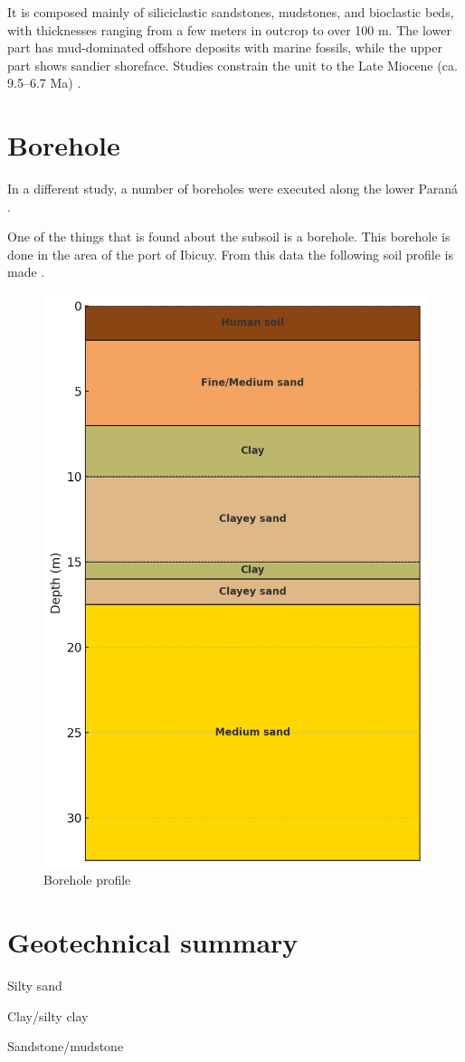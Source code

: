 It is composed mainly of siliciclastic sandstones, mudstones, and bioclastic beds, with thicknesses ranging from a few meters in outcrop to over 100 m. The lower part has mud-dominated offshore deposits with marine fossils, while the upper part shows sandier shoreface. Studies constrain the unit to the Late Miocene (ca. 9.5–6.7 Ma) \autocite{tineoReconstructingSouthAmerican2024}.

\section{Borehole}
In a different study, a number of boreholes were executed along the lower Paraná \autocite{amatoESTRATIGRAFIACUATERNARIASUBSUELO2009}.

One of the things that is found about the subsoil is a borehole. This borehole is done in the area of the port of Ibicuy. From this data the following soil profile is made  \autocite{amatoESTRATIGRAFIACUATERNARIASUBSUELO2009}.

\begin{figure}[H]
    \centering
    \includegraphics[width=0.45\linewidth]{figures//ch9/Bodemprofiel.png}
    \caption{Borehole profile}
    \label{fig:placeholder}
\end{figure}

\section{Geotechnical summary}
Silty sand

Clay/silty clay

Sandstone/mudstone